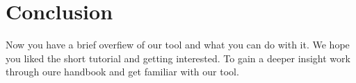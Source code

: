 




\section{Conclusion}
Now you have a brief overfiew of our tool and what you can do with it. We hope you liked the short tutorial and getting interested. To gain a deeper insight work through oure handbook and get familiar with our tool.


